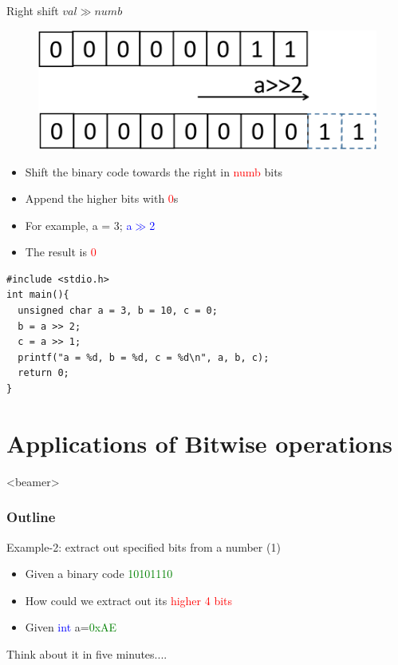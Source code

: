 \begin{frame}[fragile]{Right shift $val{\gg}numb$}
\vspace{-0.15in}
\begin{figure}
\begin{center}
	\includegraphics[width=0.5\linewidth]{figs/rshift.pdf}
\end{center}
\end{figure}
\begin{itemize}
	\item {Shift the binary code towards the right in \textcolor{red}{numb} bits}
	\item {Append the higher bits with \textcolor{red}{0}s}
	\item {For example, a = 3; \textcolor{blue}{a$\gg$2}}
	\item {The result is \textcolor{red}{0}}
\end{itemize}
\begin{lstlisting}[linewidth=0.85\linewidth]
#include <stdio.h>
int main(){
  unsigned char a = 3, b = 10, c = 0;
  b = a >> 2;
  c = a >> 1;
  printf("a = %d, b = %d, c = %d\n", a, b, c);
  return 0;
}
\end{lstlisting}
\end{frame}

\section{Applications of Bitwise operations}
\label{sec:app}
\begin{frame}<beamer>
    \frametitle{Outline}
    \tableofcontents[currentsection]
\end{frame}

\begin{frame}{Example-2: extract out specified bits from a number (1)}
\begin{itemize}
	\item {Given a binary code \textcolor{green}{10101110}}
	\vspace{0.15in}
	\item {How could we extract out its \textcolor{red}{higher 4 bits}}
	\item{Given \textcolor{blue}{int} a=\textcolor{green}{0xAE}}
\end{itemize}
\begin{center}
	\Large{Think about it in five minutes....}
\end{center}
\end{frame}

